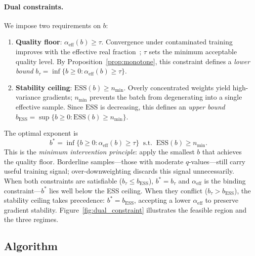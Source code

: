 \paragraph{Dual constraints.}
We impose two requirements on $b$:
\begin{enumerate}[nosep,leftmargin=*]
  \item \textbf{Quality floor}: $\alpha_{\mathrm{eff}}(b) \geq \tau$.
  Convergence under contaminated training improves with the effective real fraction~\citep{wang_2026_survive_contamination}; $\tau$ sets the minimum acceptable quality level.
  By Proposition~\ref{prop:monotone}, this constraint defines a \emph{lower bound} $b_\tau = \inf\{b \geq 0 : \alpha_{\mathrm{eff}}(b) \geq \tau\}$.
  \item \textbf{Stability ceiling}: $\mathrm{ESS}(b) \geq n_{\min}$.
  Overly concentrated weights yield high-variance gradients; $n_{\min}$ prevents the batch from degenerating into a single effective sample.
  Since $\mathrm{ESS}$ is decreasing, this defines an \emph{upper bound} $b_{\mathrm{ESS}} = \sup\{b \geq 0 : \mathrm{ESS}(b) \geq n_{\min}\}$.
\end{enumerate}
The optimal exponent is
\begin{equation}
  b^{*} = \inf\bigl\{b \geq 0 : \alpha_{\mathrm{eff}}(b) \geq \tau\bigr\} \;\;\text{s.t.}\;\; \mathrm{ESS}(b) \geq n_{\min}.
  \label{eq:bstar}
\end{equation}
This is the \emph{minimum intervention principle}: apply the smallest $b$ that achieves the quality floor.
Borderline samples---those with moderate $q$-values---still carry useful training signal; over-downweighting discards this signal unnecessarily.
When both constraints are satisfiable ($b_\tau \leq b_{\mathrm{ESS}}$), $b^{*} = b_\tau$ and $\alpha_{\mathrm{eff}}$ is the binding constraint---$b^{*}$ lies well below the ESS ceiling.
When they conflict ($b_\tau > b_{\mathrm{ESS}}$), the stability ceiling takes precedence: $b^{*} = b_{\mathrm{ESS}}$, accepting a lower $\alpha_{\mathrm{eff}}$ to preserve gradient stability.
Figure~\ref{fig:dual_constraint} illustrates the feasible region and the three regimes.

\subsection{Algorithm}
\label{sec:algorithm}

